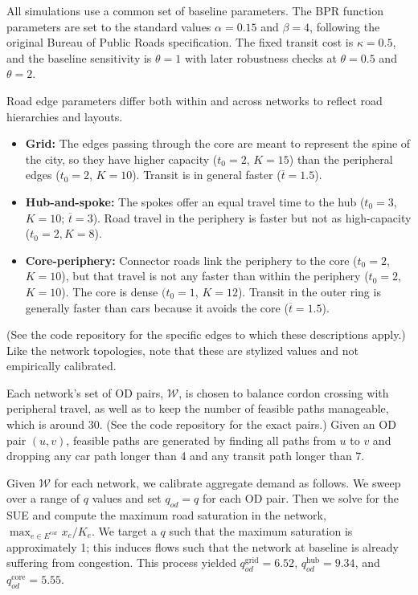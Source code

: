 \documentclass[12pt]{article}
\newcommand{\Ecar}{E^\text{car}}
\begin{document}
All simulations use a common set of baseline parameters.
The BPR function parameters are set to the standard values $\alpha = 0.15$ and $\beta = 4$, following the original Bureau of Public Roads specification.
The fixed transit cost is $\kappa = 0.5$, and the baseline sensitivity is $\theta = 1$ with later robustness checks at $\theta = 0.5$ and $\theta = 2$.

Road edge parameters differ both within and across networks to reflect road hierarchies and layouts.
\begin{itemize}[noitemsep]
    \item \textbf{Grid:} The edges passing through the core are meant to represent the spine of the city, so they have higher capacity ($t_0 = 2$, $K = 15$) than the peripheral edges ($t_0 = 2$, $K = 10$).
    Transit is in general faster ($\overline{t} = 1.5$).
    
    \item \textbf{Hub-and-spoke:} The spokes offer an equal travel time to the hub ($t_0 = 3$, $K = 10$; $\overline{t} = 3$).
    Road travel in the periphery is faster but not as high-capacity ($t_0 = 2, K = 8$).
    
    \item \textbf{Core-periphery:} Connector roads link the periphery to the core ($t_0 = 2$, $K = 10$), but that travel is not any faster than within the periphery ($t_0 = 2$, $K = 10$).
    The core is dense $(t_0 = 1$, $K = 12$).
    Transit in the outer ring is generally faster than cars because it avoids the core ($\overline{t} = 1.5$).
\end{itemize}
(See the code repository for the specific edges to which these descriptions apply.)
Like the network topologies, note that these are stylized values and not empirically calibrated.

Each network's set of OD pairs, $\mathcal{W}$, is chosen to balance cordon crossing with peripheral travel, as well as to keep the number of feasible paths manageable, which is around 30.
(See the code repository for the exact pairs.)
Given an OD pair $(u, v)$, feasible paths are generated by finding all paths from $u$ to $v$ and dropping any car path longer than 4 and any transit path longer than 7.

Given $\mathcal{W}$ for each network, we calibrate aggregate demand as follows.
We sweep over a range of $q$ values and set $q_{od} = q$ for each OD pair.
Then we solve for the SUE and compute the maximum road saturation in the network, $\max_{e \in \Ecar}{x_e/K_e}$.
We target a $q$ such that the maximum saturation is approximately 1; this induces flows such that the network at baseline is already suffering from congestion.
This process yielded $q_{od}^\text{grid} = 6.52$, $q_{od}^\text{hub} = 9.34$, and $q_{od}^\text{core} = 5.55$.
\end{document}
